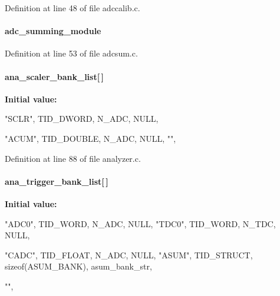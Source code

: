 Definition at line 48 of file adccalib.c.
\paragraph[{adc\_\-summing\_\-module}]{ {\bf adc\_\-summing\_\-module}}\hfill\label{analyzer_8c_a5304a76f0819218c694defe1e049c584}


Definition at line 53 of file adcsum.c.
\paragraph[{ana\_\-scaler\_\-bank\_\-list}]{ {\bf ana\_\-scaler\_\-bank\_\-list}\mbox{[}$\,$\mbox{]}}\hfill\label{analyzer_8c_a6830f2d67c920a2320b8fc6021a90f60}
{\bfseries Initial value:}
\begin{DoxyCode}
 {
   
   {"SCLR", TID_DWORD, N_ADC, NULL},

   
   {"ACUM", TID_DOUBLE, N_ADC, NULL},
   {""},
}
\end{DoxyCode}


Definition at line 88 of file analyzer.c.
\paragraph[{ana\_\-trigger\_\-bank\_\-list}]{ {\bf ana\_\-trigger\_\-bank\_\-list}\mbox{[}$\,$\mbox{]}}\hfill\label{analyzer_8c_ad663afbb61c41483d6641b5062974689}
{\bfseries Initial value:}
\begin{DoxyCode}
 {

   
   {"ADC0", TID_WORD, N_ADC, NULL},
   {"TDC0", TID_WORD, N_TDC, NULL},

   
   {"CADC", TID_FLOAT, N_ADC, NULL},
   {"ASUM", TID_STRUCT, sizeof(ASUM_BANK), asum_bank_str},

   {""},
}
\end{DoxyCode}


